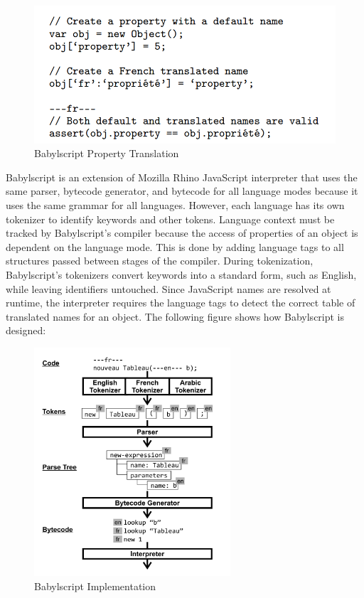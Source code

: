 \begin{figure}[H]
\centering
\includegraphics{ch2-images/babylscript2.png}
\caption{Babylscript Property Translation \cite{iu2011babylscript}}
\label{fig:Babylscript Property Translation}
\end{figure}

Babylscript is an extension of Mozilla Rhino JavaScript interpreter that uses the same parser, bytecode generator, and bytecode for all language modes because it uses the same grammar for all languages. However, each language has its own tokenizer to identify keywords and other tokens. Language context must be tracked by Babylscript's compiler because the access of properties of an object is dependent on the language mode. This is done by adding language tags to all structures passed between stages of the compiler. During tokenization, Babylscript's tokenizers convert keywords into a standard form, such as English, while leaving identifiers untouched. Since JavaScript names are resolved at runtime, the interpreter requires the language tags to detect the correct table of translated names for an object. The following figure shows how Babylscript is designed:
\begin{figure}[H]
\centering
\includegraphics[width=7.3cm]{ch2-images/babylscript3.png}
\caption{Babylscript Implementation \cite{iu2011babylscript}}
\label{fig:Babylscript Implementation}
\end{figure}

